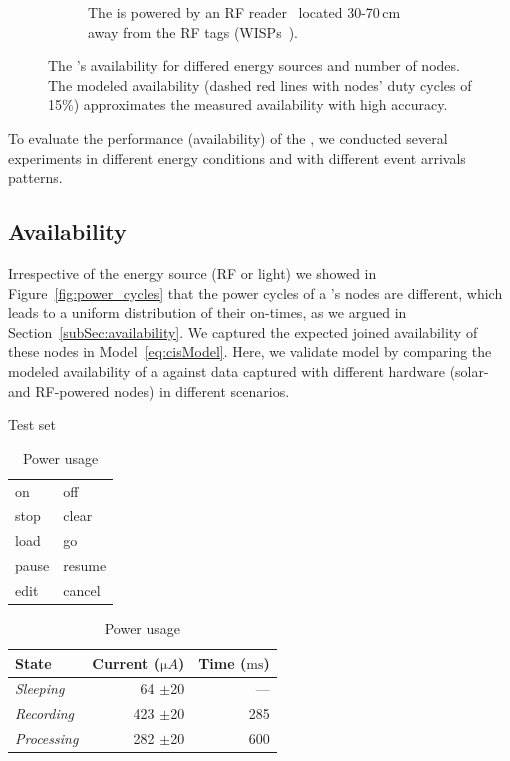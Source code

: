 \begin{figure}[h]
\begin{subfigure}{.66\columnwidth}
                \caption{The \cis is powered by an RF reader~\cite{r420_website} located 30-70\,cm away from the RF tags (WISPs~\cite{smith2006wirelessly}).}
            \label{fig:rfPwrCIS}
        \end{subfigure}
        \caption{The \fullcis's availability for differed energy sources and number of nodes. 
        The modeled availability (dashed red lines with nodes' duty cycles of 15\%) approximates the measured availability with high accuracy.}
        \label{fig:pwrCIS}
\end{figure} 
To evaluate the performance (availability) of the \fullcis, we conducted several experiments in different energy conditions and with different event arrivals patterns. 
%
\subsection{Availability}
Irrespective of the energy source (RF or light) we showed in Figure~\ref{fig:power_cycles} that the power cycles of a \cis's nodes are different, which leads to a uniform distribution of their on-times, as we argued in Section~\ref{subSec:availability}. We captured the expected joined availability of these nodes in Model~\ref{eq:cisModel}.  Here, we validate model by comparing the modeled availability of a \cis against data captured with different hardware (solar- and RF-powered nodes) in different scenarios.
%
\begin{table}[t]
\parbox{.32\linewidth}{
    \caption{Test set \ \ \ \hfill }
    \label{tab:words}
    \begin{tabular}{ll}
        \hline
        on    & off  \\ 
        stop & clear \\ 
        load   & go \\ 
        pause & resume \\ 
        edit  & cancel  \\  
        \hline  
    \end{tabular}
    } \hfill
    \parbox{.66\linewidth}{
        \caption{Power usage}
        \label{tab:power_usage}
        \begin{tabular}{lrr}\hline
            \textbf{State} & \textbf{Current ($\si{\micro A}$)} & \textbf{Time ($\si{\milli\second}$)} \\[10pt]\hline
            \textit{Sleeping} & 64 $\pm$20 & --- \\
            \textit{Recording} & 423 $\pm$20 & 285   \\
            \textit{Processing} &  282 $\pm$20 & 600\\ 
            \hline
        \end{tabular}
    }
\end{table}
